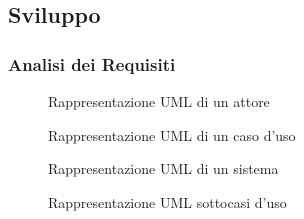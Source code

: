 \subsection{Sviluppo}

\subsubsection{Analisi dei Requisiti} \label{sec:analisi-rischi}

\begin{figure}[ht!]
    \centering
    \caption{Rappresentazione UML di un attore}
    \label{fig:Rappresentazione UML di un attore}
\end{figure}

\begin{figure}[ht!]
    \centering
    \caption{Rappresentazione UML di un caso d'uso}
    \label{fig:Rappresentazione UML di un caso d'uso}
\end{figure}

\begin{figure}[ht!]
    \centering
    \caption{Rappresentazione UML di un sistema}
    \label{fig:Rappresentazione UML di un sistema}
\end{figure}

\begin{figure}[ht!]
    \centering
    \caption{Rappresentazione UML sottocasi d'uso}
    \label{fig:Rappresentazione UML sottocasi d'uso}
\end{figure}


